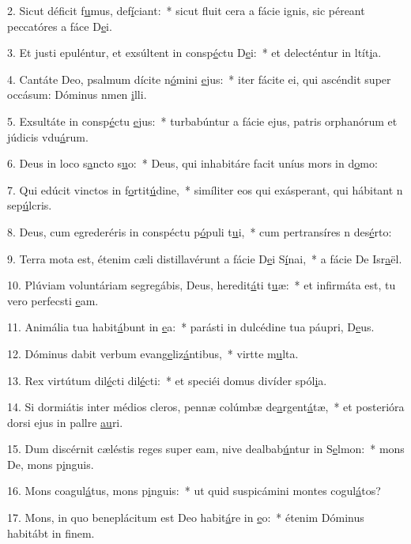 2. Sicut déficit f\uline{u}mus, def\uline{í}ciant:~* sicut fluit cera a fácie ignis, sic péreant peccatóres a fáce D\uline{e}i.\par 
3. Et justi epuléntur, et exsúltent in consp\uline{é}ctu D\uline{e}i:~* et delecténtur in ltít\uline{i}a.\par 
4. Cantáte Deo, psalmum dícite n\uline{ó}mini \uline{e}jus:~* iter fácite ei, qui ascéndit super occásum: Dóminus nmen \uline{i}lli.\par 
5. Exsultáte in consp\uline{é}ctu \uline{e}jus:~* turbabúntur a fácie ejus, patris orphanórum et júdicis vdu\uline{á}rum.\par 
6. Deus in loco s\uline{a}ncto s\uline{u}o:~* Deus, qui inhabitáre facit uníus mors in d\uline{o}mo:\par 
7. Qui edúcit vinctos in f\uline{o}rtit\uline{ú}dine,~* simíliter eos qui exásperant, qui hábitant n sep\uline{ú}lcris.\par 
8. Deus, cum egrederéris in conspéctu p\uline{ó}puli t\uline{u}i,~* cum pertransíres n des\uline{é}rto:\par 
9. Terra mota est, étenim cæli distillavérunt a fácie D\uline{e}i S\uline{í}nai,~* a fácie De Isr\uline{a}ël.\par 
10. Plúviam voluntáriam segregábis, Deus, heredit\uline{á}ti t\uline{u}æ:~* et infirmáta est, tu vero perfecsti \uline{e}am.\par 
11. Animália tua habit\uline{á}bunt in \uline{e}a:~* parásti in dulcédine tua páupri, D\uline{e}us.\par 
12. Dóminus dabit verbum evang\uline{e}liz\uline{á}ntibus,~* virtte m\uline{u}lta.\par 
13. Rex virtútum dil\uline{é}cti dil\uline{é}cti:~* et speciéi domus divíder spól\uline{i}a.\par 
14. Si dormiátis inter médios cleros, pennæ colúmbæ de\uline{a}rgent\uline{á}tæ,~* et posterióra dorsi ejus in pallre \uline{au}ri.\par 
15. Dum discérnit cæléstis reges super eam, nive dealbab\uline{ú}ntur in S\uline{e}lmon:~* mons De, mons p\uline{i}nguis.\par 
16. Mons coagul\uline{á}tus, mons p\uline{i}nguis:~* ut quid suspicámini montes cogul\uline{á}tos?\par 
17. Mons, in quo beneplácitum est Deo habit\uline{á}re in \uline{e}o:~* étenim Dóminus habitábt in f\uline{i}nem.\par 
